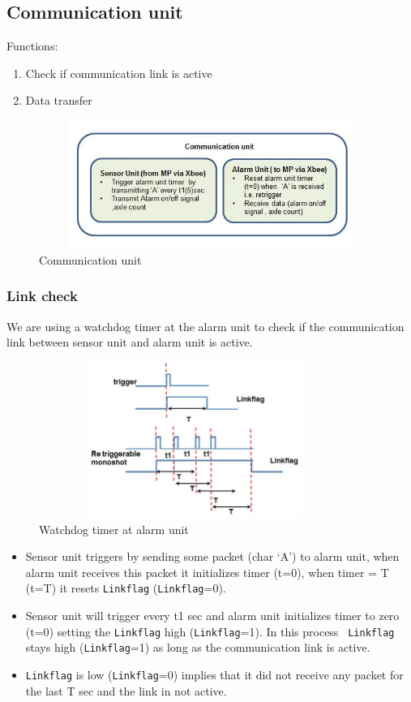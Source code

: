 \documentclass[aps,letterpaper,11pt]{article}
\begin{document}
\subsection{Communication unit}
Functions:
\begin{enumerate}
  \item Check if communication link is active
  \item Data transfer
\end{enumerate}

\begin{figure}[H]
\begin{center}
\includegraphics[height = 1.65in,width=4.5in,angle=00]{figures/block3.JPG}
\caption{\small Communication unit}
\end{center}
\end{figure}
\subsubsection{Link check}
We are using a watchdog timer at the alarm unit to check if the communication
link
between sensor unit and alarm unit is active.
\begin{figure}[H]
\begin{center}
\includegraphics[height = 2in,width=4in,angle=00]{figures/block2.JPG}
\caption{\small Watchdog timer at alarm unit}
\end{center}
\end{figure}
\begin{itemize}
\item Sensor unit triggers by sending some packet (char `A') to alarm unit,
when alarm unit
receives this packet it initializes timer (t=0), when timer = T (t=T) it
resets \texttt{Linkflag}
(\texttt{Linkflag}=0).
\item Sensor unit will trigger every t1 sec and alarm unit initializes timer
to zero (t=0) setting
the \texttt{Linkflag} high (\texttt{Linkflag}=1). In this process \texttt{
Linkflag} stays high (\texttt{Linkflag}=1) as long
as the communication link is active.
\item \texttt{Linkflag} is low (\texttt{Linkflag}=0) implies that it did not
receive any packet for the last T sec and the link in not active.
\end{itemize}
\end{document}
